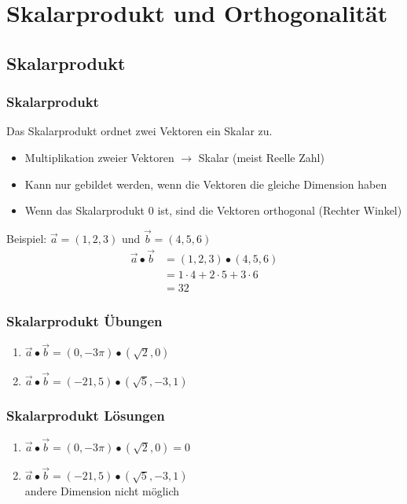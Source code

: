\section{Skalarprodukt und Orthogonalität}

\subsection{Skalarprodukt}
\begin{frame}
    \frametitle{Skalarprodukt}
    Das Skalarprodukt ordnet zwei Vektoren ein Skalar zu.
    \begin{itemize}
        \item Multiplikation zweier Vektoren $\rightarrow$ Skalar (meist Reelle Zahl)
        \item Kann nur gebildet werden, wenn die Vektoren die gleiche Dimension haben
        \item Wenn das Skalarprodukt 0 ist, sind die Vektoren orthogonal (Rechter Winkel)
    \end{itemize}
    Beispiel: $\vec{a} = (1,2,3)$ und $\vec{b} = (4,5,6)$
    \begin{align*}
        \vec{a} \bullet \vec{b} &= (1,2,3) \bullet (4,5,6) \\
        &= 1 \cdot 4 + 2 \cdot 5 + 3 \cdot 6 \\
        &= 32
    \end{align*}
\end{frame}


\begin{frame}
    \frametitle{Skalarprodukt Übungen}
    \begin{enumerate}
        \item $\vec{a} \bullet \vec{b} = (0, -3\pi) \bullet (\sqrt{2}, 0)$
        \item $\vec{a} \bullet \vec{b} = (-21, 5) \bullet (\sqrt{5}, -3, 1)$
    \end{enumerate}
\end{frame}

\begin{frame}
    \frametitle{Skalarprodukt Lösungen}
    \begin{enumerate}
        \item $\vec{a} \bullet \vec{b} = (0, -3\pi) \bullet (\sqrt{2}, 0) = 0$
        \item $\vec{a} \bullet \vec{b} = (-21, 5) \bullet (\sqrt{5}, -3, 1)$ \\andere Dimension nicht möglich
    \end{enumerate}
\end{frame}

